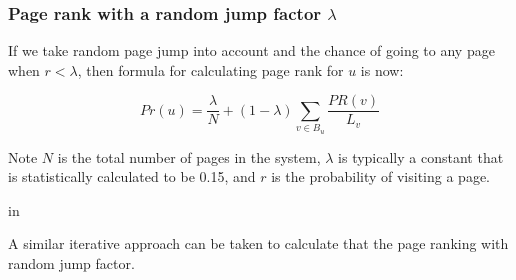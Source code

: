 \documentclass[handout,sanserif,mathserif]{beamer}
\begin{document}
\begin{frame}
\frametitle{Page rank {\bf with} a random jump factor $\lambda$}

If we take random page jump into account and the chance of going to any page when $r < \lambda$,  then formula for calculating page rank for $u$  is now:

$$ 
  Pr(u) = \frac{\lambda}{N} + ( 1- \lambda) \sum_{v\in B_u} { \frac{PR(v)}{L_v} }
$$

Note $N$ is the total number of pages in the system, $\lambda$ is typically a constant that is statistically calculated to be 0.15, and $r$ is the probability of visiting a page.  

 in

A similar iterative approach can be taken to calculate that the page ranking with random jump factor.

\end{frame}
\end{document}

